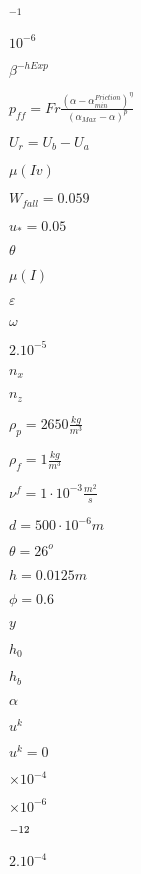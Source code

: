 \documentclass{article}
\begin{document}
$^{-1}$
\pagebreak

$ 10^{-6} $
\pagebreak

$ \beta^{-hExp}$
\pagebreak

$ p_{ff} = Fr \frac{\left( \alpha - \alpha_{min}^{Friction} \right)^{\eta}}{\left(\alpha_{Max} - \alpha \right)^p} $
\pagebreak

$ U_r=U_b-U_a $
\pagebreak

$\mu(Iv)$
\pagebreak

$W_{fall}=0.059$
\pagebreak

$u_*=0.05$
\pagebreak

$\theta$
\pagebreak

$\mu(I)$
\pagebreak

$\varepsilon$
\pagebreak

$\omega$
\pagebreak

$ 2.10^{-5}$
\pagebreak

$ n_{x}$
\pagebreak

$ n_{z}$
\pagebreak

$\rho_p=2650 \frac{kg}{m^3}$
\pagebreak

$\rho_f=1 \frac{kg}{m^3}$
\pagebreak

$\nu^f=1 \cdot 10^{-3} \frac{m^2}{s}$
\pagebreak

$d=500 \cdot 10^{-6} m$
\pagebreak

$\theta=26^o $
\pagebreak

$h=0.0125 m$
\pagebreak

$\phi=0.6$
\pagebreak

$y$
\pagebreak

$h_0$
\pagebreak

$h_b$
\pagebreak

$\alpha$
\pagebreak

$u^k$
\pagebreak

$u^k=0$
\pagebreak

$\times 10^{-4}$
\pagebreak

$\times 10^{-6}$
\pagebreak

$\time 10^{-12}$
\pagebreak

$ 2.10^{-4}$
\pagebreak
\end{document}
